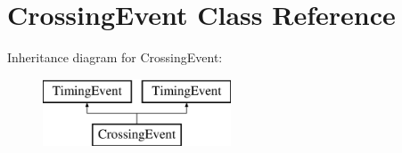 \hypertarget{classCrossingEvent}{\section{Crossing\-Event Class Reference}
\label{classCrossingEvent}
}
Inheritance diagram for Crossing\-Event\-:\begin{figure}[H]
\begin{center}
\leavevmode
\includegraphics[height=2.000000cm]{classCrossingEvent}
\end{center}
\end{figure}
